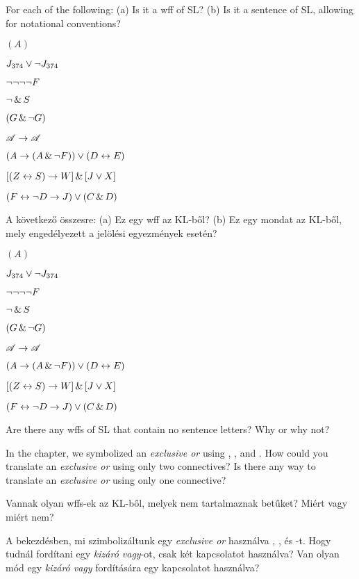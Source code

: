\solutions
\problempart
\label{pr.wiffSL}
For each of the following: (a) Is it a wff of SL? (b) Is it a sentence of SL, allowing for notational conventions?
\begin{earg}
\item $(A)$
\item $J_{374} \vee \neg J_{374}$
\item $\neg \neg \neg \neg F$
\item $\neg \,\&\, S$
\item $(G \,\&\, \neg G)$
\item $\mathscr{A} \rightarrow \mathscr{A}$
\item $(A \rightarrow (A \,\&\, \neg F)) \vee (D \leftrightarrow E)$
\item $[(Z \leftrightarrow S) \rightarrow W] \,\&\, [J \vee X]$
\item $(F \leftrightarrow \neg D \rightarrow J) \vee (C \,\&\, D)$
\end{earg}


\solutions
\problempart
\label{pr.wiffSL}
A következő összesre: (a) Ez egy wff az KL-ből? (b) Ez egy mondat az KL-ből, mely engedélyezett a jelölési egyezmények esetén?
\begin{earg}
\item $(A)$
\item $J_{374} \vee \neg J_{374}$
\item $\neg \neg \neg \neg F$
\item $\neg \,\&\, S$
\item $(G \,\&\, \neg G)$
\item $\mathscr{A} \rightarrow \mathscr{A}$
\item $(A \rightarrow (A \,\&\, \neg F)) \vee (D \leftrightarrow E)$
\item $[(Z \leftrightarrow S) \rightarrow W] \,\&\, [J \vee X]$
\item $(F \leftrightarrow \neg D \rightarrow J) \vee (C \,\&\, D)$
\end{earg}


\problempart
\begin{earg}
\item Are there any wffs of SL that contain no sentence letters? Why or why not?
\item In the chapter, we symbolized an \emph{exclusive or} using \eor, \eand, and \enot. How could you translate an \emph{exclusive or} using only two connectives? Is there any way to translate an \emph{exclusive or} using only one connective?
\end{earg}

\problempart
\begin{earg}
\item Vannak olyan wffs-ek az KL-ből, melyek nem tartalmaznak betűket? Miért vagy miért nem?
\item A bekezdésben, mi szimbolizáltunk egy \emph{exclusive or} használva \eor, \eand, és \enot -t. Hogy tudnál fordítani egy \emph{kizáró vagy}-ot, csak két kapcsolatot használva? Van olyan mód egy \emph{kizáró vagy} fordítására egy kapcsolatot használva?
\end{earg}


